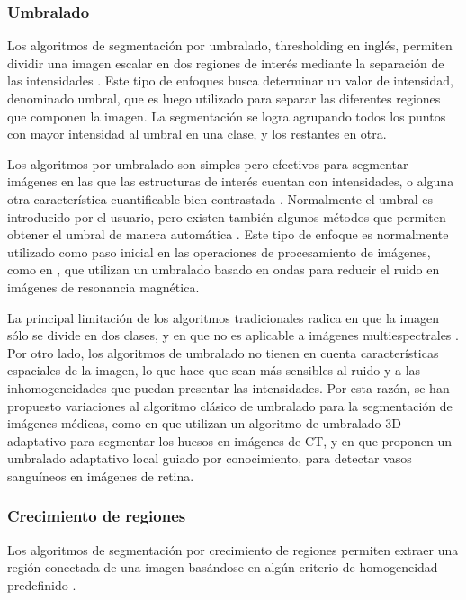 \subsubsection{Umbralado}
Los algoritmos de segmentación por umbralado,  thresholding en inglés, permiten dividir una imagen escalar en dos regiones de interés mediante la separación de las intensidades \citep{weszka1978survey}. Este tipo de enfoques busca determinar un valor de intensidad, denominado umbral, que es luego utilizado para separar las diferentes regiones que componen la imagen. La segmentación se logra agrupando todos los puntos con mayor intensidad al umbral en una clase, y los restantes en otra.

Los algoritmos por umbralado son simples pero efectivos para segmentar imágenes en las que las estructuras de interés cuentan con intensidades, o alguna otra característica cuantificable bien contrastada \citep{pham2000current}. Normalmente el umbral es introducido por el usuario, pero existen también algunos métodos que permiten obtener el umbral de manera automática \citep{sahoo1988survey}. Este tipo de enfoque es normalmente utilizado como paso inicial en las operaciones de procesamiento de imágenes, como en \citep{bao2003noise}, que utilizan un umbralado basado en ondas para reducir el ruido en imágenes de resonancia magnética.

La  principal limitación de los algoritmos tradicionales radica en que la imagen sólo se divide en dos clases, y en que no es aplicable a imágenes multiespectrales \citep{pham2000current}. Por otro lado, los algoritmos de umbralado no tienen en cuenta características espaciales de la imagen, lo que hace que sean más sensibles al ruido y a las inhomogeneidades que puedan presentar las intensidades. Por esta razón, se han propuesto variaciones al algoritmo clásico de umbralado para la segmentación de imágenes médicas, como en \citep{zhang2010fast} que utilizan un algoritmo de umbralado 3D adaptativo para segmentar los huesos en imágenes de CT, y en \citep{jiang2003adaptive} que proponen un umbralado adaptativo local guiado por conocimiento, para detectar vasos sanguíneos en imágenes de retina.

\subsubsection{Crecimiento de regiones}
Los algoritmos de segmentación por crecimiento de regiones permiten extraer una región conectada de una imagen basándose en algún criterio de homogeneidad predefinido \citep{haralick1985image}.

